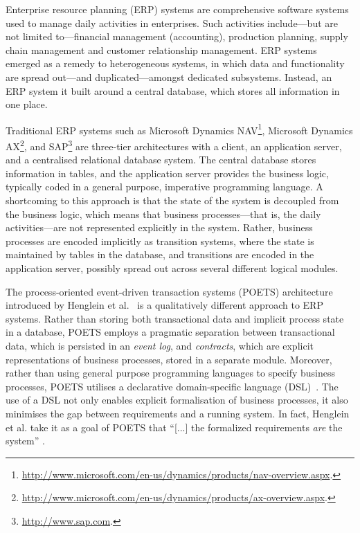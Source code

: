 Enterprise resource planning (ERP) systems are comprehensive software
systems used to manage daily activities in enterprises. Such
activities include---but are not limited to---financial management
(accounting), production planning, supply chain management and
customer relationship management. ERP systems emerged as a remedy to
heterogeneous systems, in which data and functionality are spread
out---and duplicated---amongst dedicated subsystems. Instead, an ERP
system it built around a central database, which stores all
information in one place.

Traditional ERP systems such as
Microsoft Dynamics
NAV\footnote{\url{http://www.microsoft.com/en-us/dynamics/products/nav-overview.aspx}.},
Microsoft Dynamics
AX\footnote{\url{http://www.microsoft.com/en-us/dynamics/products/ax-overview.aspx}.}, and
SAP\footnote{\url{http://www.sap.com}.}
are three-tier architectures with a client, an application
server, and a centralised relational database system. The central database
stores information in tables, and the application server provides the
business logic, typically coded in a general purpose, imperative
programming language. A shortcoming to this approach is
that the state of the system is decoupled from the business logic,
which means that business processes---that is, the daily
activities---are not represented explicitly in the system. Rather,
business processes are encoded implicitly as transition systems, where
the state is maintained by tables in the database, and transitions are
encoded in the application server, possibly spread out across several
different logical modules.

The process-oriented event-driven transaction systems (POETS)
architecture introduced by Henglein et al.~\cite{henglein09jlap} is a
qualitatively different approach to ERP systems. Rather than storing
both transactional data and implicit process state in a database,
POETS employs a pragmatic separation between transactional data, which
is persisted in an \emph{event log}, and \emph{contracts}, which are
explicit representations of business processes, stored in a separate
module. Moreover, rather than using general purpose programming
languages to specify business processes, POETS utilises a declarative
domain-specific language (DSL)~\cite{andersen06sttt}. The use of a DSL
not only enables explicit formalisation of business processes, it also
minimises the gap between requirements and a running system. In fact,
Henglein et al. take it as a goal of POETS that ``[...] the formalized
requirements \emph{are} the system''  \cite[page 382]{henglein09jlap}.

